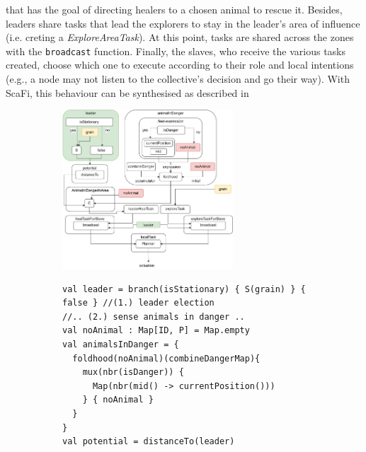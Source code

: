  that has the goal of directing healers to a chosen animal to 
 rescue it. Besides, leaders share tasks that lead the explorers 
 to stay in the leader's area of influence (i.e. creting a \emph{ExploreAreaTask}).
%
At this point, tasks are shared across 
 the zones with the \lstinline|broadcast| function.
%
Finally, the slaves, who receive the various tasks created,
 choose which one to execute according to their role and 
 local intentions (e.g., a node may not listen to 
 the collective's decision and go their way).
%
With ScaFi, this behaviour can be synthesised as described in 
%
\begin{figure}[t!]
\centering
\begin{subfigure}[b]{\textwidth}
\centering
\includegraphics[width=0.7\textwidth]{papers/mdpi2020/imgs/wildlife-program-diagram.pdf}
\caption[High-level diagram expressing the implemented scenario]{\label{fig:eval:diagram}}
\end{subfigure}
\par\bigskip %
\begin{subfigure}[b]{\textwidth}
\centering
\begin{lstlisting}
val leader = branch(isStationary) { S(grain) } { false } //(1.) leader election
//.. (2.) sense animals in danger ..
val noAnimal : Map[ID, P] = Map.empty
val animalsInDanger = {
  foldhood(noAnimal)(combineDangerMap){
    mux(nbr(isDanger)) {
      Map(nbr(mid() -> currentPosition()))
    } { noAnimal }
  }
}
val potential = distanceTo(leader)

\end{lstlisting}
\end{subfigure}
\end{figure}
